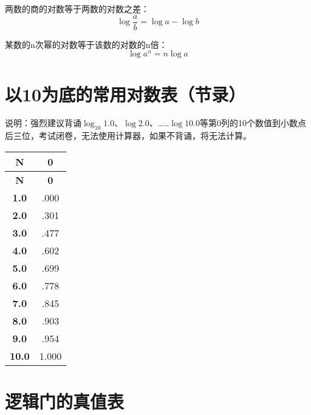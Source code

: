 两数的商的对数等于两数的对数之差：
$$\log\frac{a}{b}=\log a-\log b$$

某数的n次幂的对数等于该数的对数的n倍：
$$\log a^n =n\log a$$

\newpage


\section{以10为底的常用对数表（节录）}

说明：强烈建议背诵$\log_{10} 1.0$、$\log 2.0$、……$\log 10.0$等第0列的10个数值到小数点后三位，考试闭卷，无法使用计算器，如果不背诵，将无法计算。

\begin{longtable}[c]{|c|c|}
\hline
\textbf{N} & \textbf{0} \\
\hline
\endfirsthead
\hline
\textbf{N} & \textbf{0} \\
\endhead
\textbf{1.0} & .000 \\ \hline
\textbf{2.0} & .301 \\ \hline
\textbf{3.0} & .477 \\ \hline
\textbf{4.0} & .602 \\ \hline
\textbf{5.0} & .699 \\ \hline
\textbf{6.0} & .778 \\ \hline
\textbf{7.0} & .845 \\ \hline
\textbf{8.0} & .903 \\ \hline
\textbf{9.0} & .954 \\ \hline
\textbf{10.0} & 1.000 \\ \hline
\end{longtable}

\newpage

\section{逻辑门的真值表}


